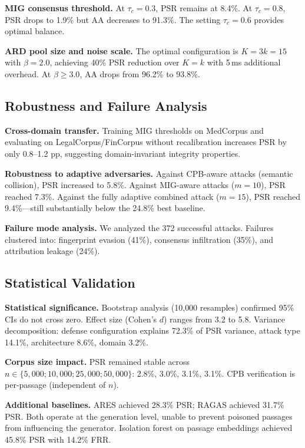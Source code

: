 \documentclass[journal,10pt]{IEEEtran}
\begin{document}
\textbf{MIG consensus threshold.}
At $\tau_c = 0.3$, PSR remains at 8.4\%. At $\tau_c = 0.8$, PSR drops to 1.9\% but AA decreases to 91.3\%. The setting $\tau_c = 0.6$ provides optimal balance.

\textbf{ARD pool size and noise scale.}
The optimal configuration is $K=3k=15$ with $\beta=2.0$, achieving 40\% PSR reduction over $K=k$ with 5\,ms additional overhead. At $\beta \geq 3.0$, AA drops from 96.2\% to 93.8\%.

\subsection{Robustness and Failure Analysis}
\textbf{Cross-domain transfer.}
Training MIG thresholds on MedCorpus and evaluating on LegalCorpus/FinCorpus without recalibration increases PSR by only 0.8--1.2 pp, suggesting domain-invariant integrity properties.

\textbf{Robustness to adaptive adversaries.}
Against CPB-aware attacks (semantic collision), PSR increased to 5.8\%. Against MIG-aware attacks ($m=10$), PSR reached 7.3\%. Against the fully adaptive combined attack ($m=15$), PSR reached 9.4\%---still substantially below the 24.8\% best baseline.

\textbf{Failure mode analysis.}
We analyzed the 372 successful attacks. Failures clustered into: fingerprint evasion (41\%), consensus infiltration (35\%), and attribution leakage (24\%).

\subsection{Statistical Validation}
\textbf{Statistical significance.}
Bootstrap analysis (10{,}000 resamples) confirmed 95\% CIs do not cross zero. Effect size (Cohen's $d$) ranges from 3.2 to 5.8. Variance decomposition: defense configuration explains 72.3\% of PSR variance, attack type 14.1\%, architecture 8.6\%, domain 3.2\%.

\textbf{Corpus size impact.}
PSR remained stable across $n \in \{5{,}000; 10{,}000; 25{,}000; 50{,}000\}$: 2.8\%, 3.0\%, 3.1\%, 3.1\%. CPB verification is per-passage (independent of $n$).

\textbf{Additional baselines.}
ARES achieved 28.3\% PSR; RAGAS achieved 31.7\% PSR. Both operate at the generation level, unable to prevent poisoned passages from influencing the generator. Isolation forest on passage embeddings achieved 45.8\% PSR with 14.2\% FRR.
\end{document}
